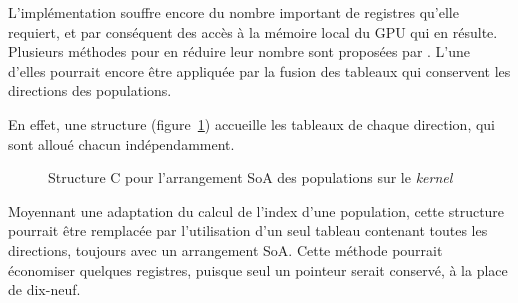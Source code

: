 L'implémentation souffre encore du nombre important de registres qu'elle requiert, et par conséquent des accès à la mémoire local du \acs{GPU} qui en résulte. Plusieurs méthodes pour en réduire leur nombre sont proposées par \citet{tran_performance_2017}. L'une d'elles pourrait encore être appliquée par la fusion des tableaux qui conservent les directions des populations. 

En effet, une structure (figure~\ref{fig:struct_c_population}) accueille les tableaux de chaque direction, qui sont alloué chacun indépendamment.

\begin{figure}
\centering
\label{fig:struct_c_population}

\caption{Structure C pour l'arrangement \acs{SoA} des populations sur le \textit{kernel}}
\end{figure}


Moyennant une adaptation du calcul de l'index d'une population, cette structure pourrait être remplacée par l'utilisation d'un seul tableau contenant toutes les directions, toujours avec un arrangement \acs{SoA}. Cette méthode pourrait économiser quelques registres, puisque seul un pointeur serait conservé, à la place de dix-neuf.